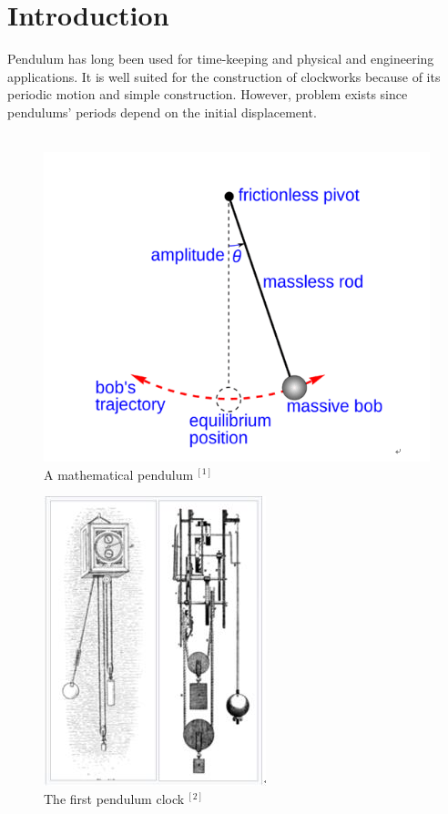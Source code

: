 \documentclass[12pt,a4paper]{article}
\begin{document}
\section{Introduction}
Pendulum has long been used for time-keeping and physical and engineering applications. It is well suited for the construction of clockworks because of its periodic motion and simple construction. However, problem exists since pendulums’ periods depend on the initial displacement.\\
~\\
\begin{figure}[!htbp]
    \centering
    \includegraphics[scale=0.35]{intro1.png}
    \caption{A mathematical pendulum$~^{[1]}$}
    \label{1}
\end{figure}
\begin{figure}[!htbp]
    \centering
    \includegraphics[scale=0.35]{intro2.jpg}
    \caption{The first pendulum clock$~^{[2]}$}
    \label{1}
\end{figure}
\end{document}
